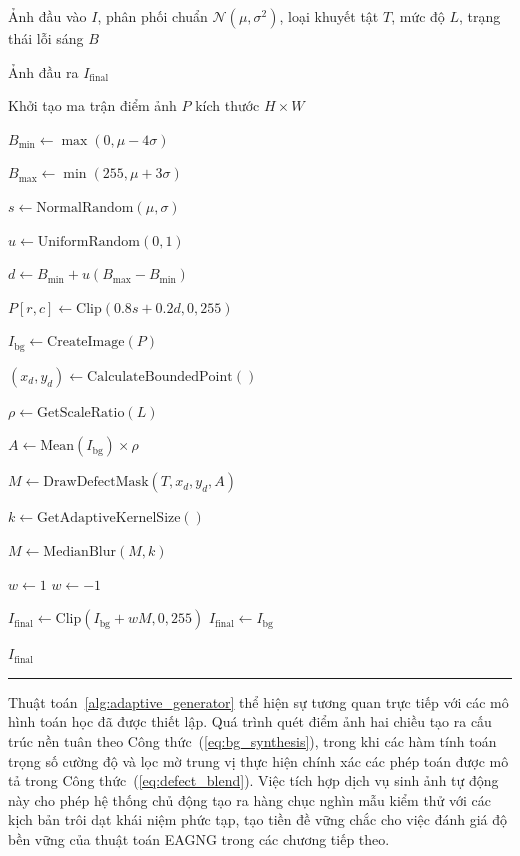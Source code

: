 \begin{algorithmic}[1]

\Require
Ảnh đầu vào $I$, phân phối chuẩn $\mathcal{N}(\mu,\sigma^2)$,
loại khuyết tật $T$, mức độ $L$, trạng thái lỗi sáng $B$

\Ensure
Ảnh đầu ra $I_{\mathrm{final}}$

\State Khởi tạo ma trận điểm ảnh $P$ kích thước $H \times W$

\State
$B_{\min} \gets \max(0,\mu-4\sigma)$

\State
$B_{\max} \gets \min(255,\mu+3\sigma)$

        \State
        $s \gets \mathrm{NormalRandom}(\mu,\sigma)$
        
        \State
        $u \gets \mathrm{UniformRandom}(0,1)$
        
        \State
        $d \gets B_{\min}+u(B_{\max}-B_{\min})$
        
        \State
        $P[r,c] \gets
        \mathrm{Clip}(0.8s+0.2d,0,255)$
    \EndFor
\EndFor

\State
$I_{\mathrm{bg}} \gets \mathrm{CreateImage}(P)$

    \State
    $(x_d,y_d) \gets \mathrm{CalculateBoundedPoint}()$
    
    \State
    $\rho \gets \mathrm{GetScaleRatio}(L)$
    
    \State
    $A \gets \mathrm{Mean}(I_{\mathrm{bg}})\times\rho$
    
    \State
    $M \gets \mathrm{DrawDefectMask}(T,x_d,y_d,A)$
    
    \State
    $k \gets \mathrm{GetAdaptiveKernelSize}()$
    
    \State
    $M \gets \mathrm{MedianBlur}(M,k)$
    
        \State $w \gets 1$
    \Else
        \State $w \gets -1$
    \EndIf
    
    \State
    $I_{\mathrm{final}}
    \gets \mathrm{Clip}(I_{\mathrm{bg}}+wM,0,255)$
\Else
    \State
    $I_{\mathrm{final}} \gets I_{\mathrm{bg}}$
\EndIf

\State \Return $I_{\mathrm{final}}$

\end{algorithmic}
\vspace{2pt}
\noindent\hrule
\bigskip

Thuật toán~\ref{alg:adaptive_generator} thể hiện sự tương quan trực tiếp với các mô hình toán học đã được thiết lập. Quá trình quét điểm ảnh hai chiều tạo ra cấu trúc nền tuân theo Công thức~(\ref{eq:bg_synthesis}), trong khi các hàm tính toán trọng số cường độ và lọc mờ trung vị thực hiện chính xác các phép toán được mô tả trong Công thức~(\ref{eq:defect_blend}). Việc tích hợp dịch vụ sinh ảnh tự động này cho phép hệ thống chủ động tạo ra hàng chục nghìn mẫu kiểm thử với các kịch bản trôi dạt khái niệm phức tạp, tạo tiền đề vững chắc cho việc đánh giá độ bền vững của thuật toán EAGNG trong các chương tiếp theo.
